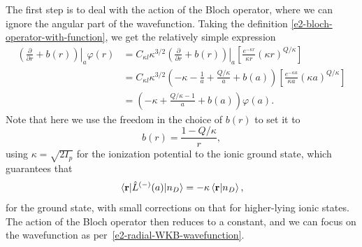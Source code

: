 The first step is to deal with the action of the Bloch operator, where we can ignore the angular part of the wavefunction. Taking the definition \eqref{e2-bloch-operator-with-function}, we get the relatively simple expression
\begin{align}
\left.\left(\frac{\partial}{\partial r}+b(r)\right)\right|_{a} \varphi(r)
& = 
C_{\kappa l} \kappa^{3/2}\left.\left(\frac{\partial}{\partial r}+b(r)\right)\right|_{a} \left[ \frac{e^{-\kappa r}}{\kappa r}(\kappa r)^{Q/\kappa}\right]
\nonumber \\ & = 
C_{\kappa l} \kappa^{3/2}\left.\left(-\kappa-\frac{1}{a}+\frac{Q/\kappa}{a}+b(a)\right)\right. \left[ \frac{e^{-\kappa a}}{\kappa a}(\kappa a)^{Q/\kappa}\right]
\nonumber \\ & = 
\left(-\kappa+\frac{Q/\kappa-1}{a}+b(a)\right)\varphi(a).
\end{align}
Note that here we use the freedom in the choice of $b(r)$ to set it to
\begin{equation}
b(r) = \frac{1-Q/\kappa}{r},
\end{equation}
using $\kappa=\sqrt{2I_p}$ for the ionization potential to the ionic ground state, which guarantees that 
\begin{equation}
\matrixel{\vbr}{\hat{L}^{(-)}(a)}{n_D} = -\kappa \braket{\vbr}{n_D},
\label{e2-wkb-explicit-expression}
\end{equation}
for the ground state, with small corrections on that for higher-lying ionic states. The action of the Bloch operator then reduces to a constant, and we can focus on the wavefunction as per~\eqref{e2-radial-WKB-wavefunction}.

